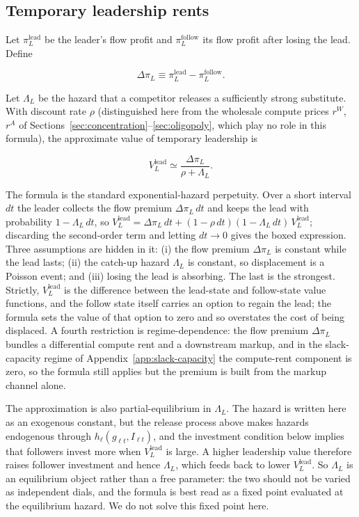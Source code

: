 \documentclass[11pt]{article}
\begin{document}
\subsection{Temporary leadership rents}

Let $\pi_L^{\mathrm{lead}}$ be the leader's flow profit and $\pi_L^{\mathrm{follow}}$ its flow profit after losing the lead. Define

\begin{equation}\Delta\pi_L\equiv\pi_L^{\mathrm{lead}}-\pi_L^{\mathrm{follow}}.\end{equation}

Let $\Lambda_L$ be the hazard that a competitor releases a sufficiently strong substitute. With discount rate $\rho$ (distinguished here from the wholesale compute prices $r^W$, $r^A$ of Sections~\ref{sec:concentration}--\ref{sec:oligopoly}, which play no role in this formula), the approximate value of temporary leadership is

\begin{equation}\boxed{V_L^{\mathrm{lead}}\simeq\frac{\Delta\pi_L}{\rho+\Lambda_L}.}\end{equation}

The formula is the standard exponential-hazard perpetuity. Over a short interval $dt$ the leader collects the flow premium $\Delta\pi_L\,dt$ and keeps the lead with probability $1-\Lambda_L\,dt$, so $V_L^{\mathrm{lead}}=\Delta\pi_L\,dt+(1-\rho\,dt)(1-\Lambda_L\,dt)\,V_L^{\mathrm{lead}}$; discarding the second-order term and letting $dt\to0$ gives the boxed expression. Three assumptions are hidden in it: (i) the flow premium $\Delta\pi_L$ is constant while the lead lasts; (ii) the catch-up hazard $\Lambda_L$ is constant, so displacement is a Poisson event; and (iii) losing the lead is absorbing. The last is the strongest. Strictly, $V_L^{\mathrm{lead}}$ is the difference between the lead-state and follow-state value functions, and the follow state itself carries an option to regain the lead; the formula sets the value of that option to zero and so overstates the cost of being displaced. A fourth restriction is regime-dependence: the flow premium $\Delta\pi_L$ bundles a differential compute rent and a downstream markup, and in the slack-capacity regime of Appendix~\ref{app:slack-capacity} the compute-rent component is zero, so the formula still applies but the premium is built from the markup channel alone.

The approximation is also partial-equilibrium in $\Lambda_L$. The hazard is written here as an exogenous constant, but the release process above makes hazards endogenous through $h_\ell(g_{\ell t},I_{\ell t})$, and the investment condition below implies that followers invest more when $V_L^{\mathrm{lead}}$ is large. A higher leadership value therefore raises follower investment and hence $\Lambda_L$, which feeds back to lower $V_L^{\mathrm{lead}}$. So $\Lambda_L$ is an equilibrium object rather than a free parameter: the two should not be varied as independent dials, and the formula is best read as a fixed point evaluated at the equilibrium hazard. We do not solve this fixed point here.
\end{document}
